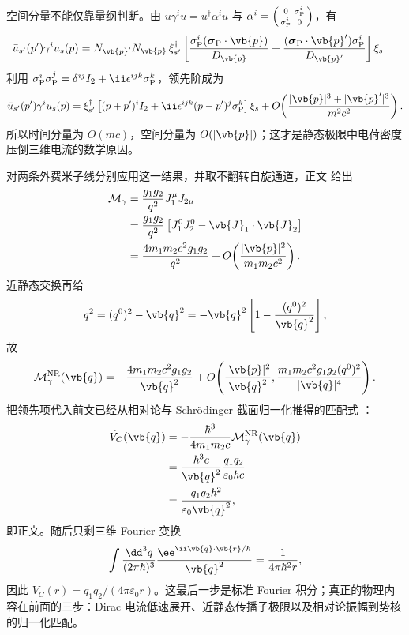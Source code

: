 \begin{derivation}
空间分量不能仅靠量纲判断。由
$\bar u\gamma^iu=u^\dagger\alpha^iu$ 与
$\alpha^i=\begin{psmallmatrix}0&\sigma_{\rm P}^i\\
\sigma_{\rm P}^i&0\end{psmallmatrix}$，有
\begin{align*}
 \bar u_{s'}(p')\gamma^iu_s(p)
 ={}&N_{\vb{p}'}N_{\vb{p}}\,
 \xi_{s'}^\dagger\left[
 \frac{\sigma_{\rm P}^i(\boldsymbol\sigma_{\rm P}\cdot\vb{p})}{D_{\vb{p}}}
 +\frac{(\boldsymbol\sigma_{\rm P}\cdot\vb{p}')\sigma_{\rm P}^i}{D_{\vb{p}'}}
 \right]\xi_s.
\end{align*}
利用
$\sigma_{\rm P}^i\sigma_{\rm P}^j
=\delta^{ij}I_2+\ii\epsilon^{ijk}\sigma_{\rm P}^k$，领先阶成为
\begin{equation*}
 {
 \bar u_{s'}(p')\gamma^iu_s(p)
 =\xi_{s'}^\dagger\left[
 (p+p')^i I_2
 +\ii\epsilon^{ijk}(p-p')^j\sigma_{\rm P}^k
 \right]\xi_s
 +O\!\left(\frac{|\vb{p}|^3+|\vb{p}'|^3}{m^2c^2}\right).}
\end{equation*}
所以时间分量为 $O(mc)$，空间分量为 $O(|\vb{p}|)$；这才是静态极限中电荷密度压倒三维电流的数学原因。

对两条外费米子线分别应用这一结果，并取不翻转自旋通道，正文 给出
\begin{align*}
 \mathcal M_\gamma
 &=\frac{g_1g_2}{q^2}
 J_1^\mu J_{2\mu}\\
 &=\frac{g_1g_2}{q^2}
 \left[J_1^0J_2^0-\vb{J}_1\cdot\vb{J}_2\right]\\
 &=\frac{4m_1m_2c^2g_1g_2}{q^2}
 +O\!\left(\frac{|\vb{p}|^2}{m_1m_2c^2}\right).
\end{align*}
近静态交换再给
\begin{equation*}
 q^2=(q^0)^2-\vb{q}^2
 =-\vb{q}^2\left[
 1-\frac{(q^0)^2}{\vb{q}^2}
 \right],
\end{equation*}
故
\begin{equation*}
 \mathcal M_\gamma^{\rm NR}(\vb{q})
 =-\frac{4m_1m_2c^2g_1g_2}{\vb{q}^2}
 +O\!\left(
 \frac{|\vb{p}|^2}{\vb{q}^2},
 \frac{m_1m_2c^2g_1g_2(q^0)^2}{|\vb{q}|^4}
 \right).
\end{equation*}
把领先项代入前文已经从相对论与 Schrödinger 截面归一化推得的匹配式
：
\begin{align*}
 \widetilde V_C(\vb{q})
 &=-\frac{\hbar^3}{4m_1m_2c}
 \mathcal M_\gamma^{\rm NR}(\vb{q})\\
 &=\frac{\hbar^3c}{\vb{q}^2}
 \frac{q_1q_2}{\varepsilon_0\hbar c}\\
 &={\frac{q_1q_2\hbar^2}
 {\varepsilon_0\vb{q}^2}},
\end{align*}
即正文。随后只剩三维 Fourier 变换
\begin{equation*}
 \int\frac{\dd^3q}{(2\pi\hbar)^3}
 \frac{\ee^{\ii\vb{q}\cdot\vb{r}/\hbar}}{\vb{q}^2}
 =\frac{1}{4\pi\hbar^2r},
\end{equation*}
因此
$V_C(r)=q_1q_2/(4\pi\varepsilon_0r)$。这最后一步是标准 Fourier 积分；真正的物理内容在前面的三步：Dirac 电流低速展开、近静态传播子极限以及相对论振幅到势核的归一化匹配。
\end{derivation}


